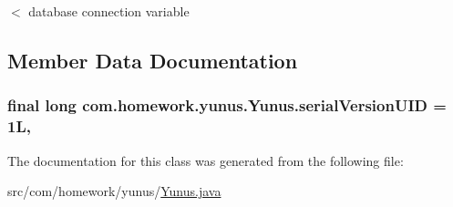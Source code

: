 $<$ database connection variable 

\subsection{Member Data Documentation}
\subsubsection[{\texorpdfstring{serial\+Version\+U\+ID}{serialVersionUID}}]{\setlength{\rightskip}{0pt plus 5cm}final long com.\+homework.\+yunus.\+Yunus.\+serial\+Version\+U\+ID = 1L\hspace{0.3cm}{\ttfamily [static]}, {\ttfamily [private]}}\hypertarget{classcom_1_1homework_1_1yunus_1_1_yunus_a135ed76b5ead6a58aa5f941be9477ed1}{}\label{classcom_1_1homework_1_1yunus_1_1_yunus_a135ed76b5ead6a58aa5f941be9477ed1}


The documentation for this class was generated from the following file\+:\begin{DoxyCompactItemize}
\item 
src/com/homework/yunus/\hyperlink{_yunus_8java}{Yunus.\+java}\end{DoxyCompactItemize}
